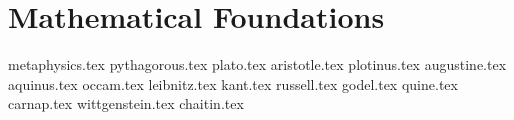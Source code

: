 \part{Mathematical Foundations}

{metaphysics.tex}
{pythagorous.tex}
{plato.tex}
{aristotle.tex}
{plotinus.tex}
{augustine.tex}
{aquinus.tex}
{occam.tex}
{leibnitz.tex}
{kant.tex}
{russell.tex}
{godel.tex}
{quine.tex}
{carnap.tex}
{wittgenstein.tex}
{chaitin.tex}